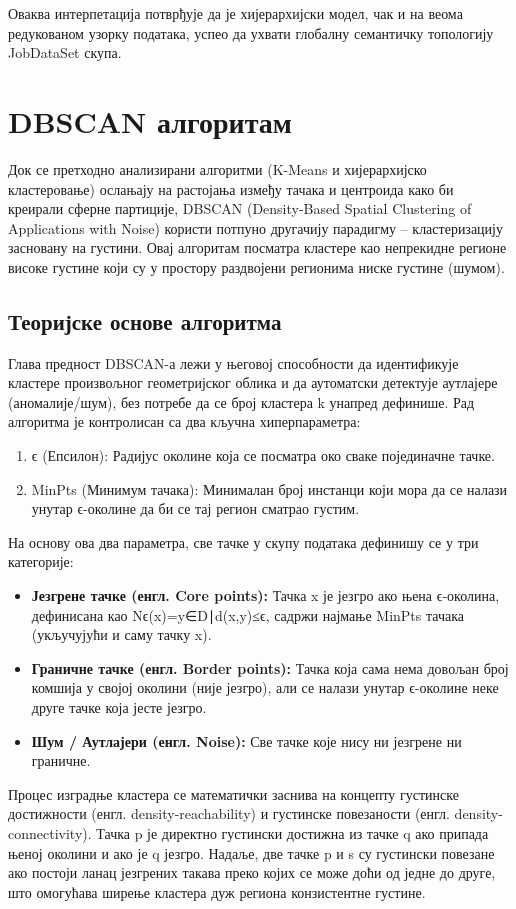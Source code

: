 \documentclass[a4paper,12pt]{report}
\begin{document}
	Оваква интерпетација потврђује да је хијерархијски модел, чак и на веома редукованом узорку података, успео да ухвати глобалну семантичку топологију JobDataSet скупа.
	
	\section{DBSCAN алгоритам}
	Док се претходно анализирани алгоритми (K-Means и хијерархијско кластеровање) ослањају на растојања између тачака и центроида како би креирали сферне партиције, DBSCAN (Density-Based Spatial Clustering of Applications with Noise) користи потпуно другачију парадигму – кластеризацију засновану на густини. Овај алгоритам посматра кластере као непрекидне регионе високе густине који су у простору раздвојени регионима ниске густине (шумом).
	
	\subsection{Теоријске основе алгоритма}
	Глава предност DBSCAN-а лежи у његовој способности да идентификује кластере произвољног геометријског облика и да аутоматски детектује аутлајере (аномалије/шум), без потребе да се број кластера k унапред дефинише. Рад алгоритма је контролисан са два кључна хиперпараметра:
	\begin{enumerate}
		\item ϵ (Епсилон): Радијус околине која се посматра око сваке појединачне тачке.
		\item MinPts (Минимум тачака): Минималан број инстанци који мора да се налази унутар ϵ-околине да би се тај регион сматрао густим.
	\end{enumerate}
	На основу ова два параметра, све тачке у скупу података дефинишу се у три категорије:
	\begin{itemize}
		\item \textbf{Језгрене тачке (енгл. Core points):} Тачка x је језгро ако њена ϵ-околина, дефинисана као Nϵ​(x)={y∈D∣d(x,y)≤ϵ}, садржи најмање MinPts тачака (укључујући и саму тачку x).
		
		\item \textbf{Граничне тачке (енгл. Border points):} Тачка која сама нема довољан број комшија у својој околини (није језгро), али се налази унутар ϵ-околине неке друге тачке која јесте језгро.
		
		\item \textbf{Шум / Аутлајери (енгл. Noise):} Све тачке које нису ни језгрене ни граничне.
	\end{itemize}
	Процес изградње кластера се математички заснива на концепту густинске достижности (енгл. density-reachability) и густинске повезаности (енгл. density-connectivity). Тачка p је директно густински достижна из тачке q ако припада њеној околини и ако је q језгро. Надаље, две тачке p и s су густински повезане ако постоји ланац језгрених такава преко којих се може доћи од једне до друге, што омогућава ширење кластера дуж региона конзистентне густине.
	
\end{document}
